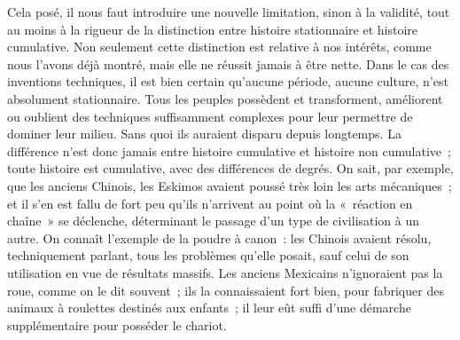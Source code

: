 \documentclass[french,twoside]{book} %
\begin{document}
Cela posé, il nous faut introduire une nouvelle limitation, sinon à la validité, tout au moins à la rigueur de la distinction entre histoire stationnaire et histoire cumulative. Non seulement cette distinction est relative à nos intérêts, comme nous l’avons déjà montré, mais elle ne réussit jamais à être nette. Dans le cas des inventions techniques, il est bien certain qu’aucune période, aucune culture, n’est absolument stationnaire. Tous les peuples possèdent et transforment, améliorent ou oublient des techniques suffisamment complexes pour leur permettre de dominer leur milieu. Sans quoi ils auraient disparu depuis longtemps. La différence n’est donc jamais entre histoire cumulative et histoire non cumulative ; toute histoire est cumulative, avec des différences de degrés. On sait, par exemple, que les anciens Chinois, les Eskimos avaient poussé très loin les arts mécaniques ; et il s’en est fallu de fort peu qu’ils n’arrivent au point où la « réaction en chaîne » se déclenche, déterminant le passage d’un type de civilisation à un autre. On connaît l’exemple de la poudre à canon : les Chinois avaient résolu, techniquement parlant, tous les problèmes qu’elle posait, sauf celui de son utilisation en vue de résultats massifs. Les anciens Mexicains n’ignoraient pas la roue, comme on le dit souvent ; ils la connaissaient fort bien, pour fabriquer des animaux à roulettes destinés aux enfants ; il leur eût suffi d’une démarche supplémentaire pour posséder le chariot.\par
\end{document}
